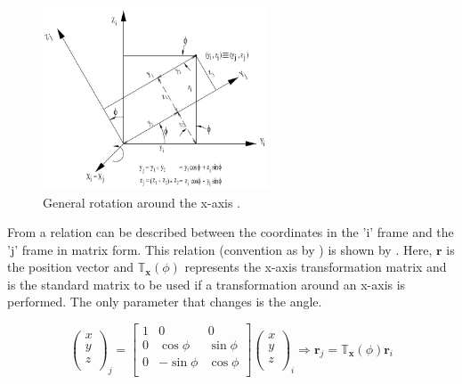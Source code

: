 \begin{figure}[!ht]
\centering
\includegraphics[width=0.6\textwidth]{figures/reference_frames/xtrans_mooij2013stat.jpg}
\caption{General rotation around the x-axis \citep{mooij2013stat}.}
\label{fig:xtrans_mooij2013stat}
\end{figure}

From  a relation can be described between the coordinates in the 'i' frame and the 'j' frame in matrix form. This relation (convention as by \cite{mooij2013stat}) is shown by . Here, $\mathbf{r}$ is the position vector and $\mathbb{T}_{\mathbf{x}}(\phi)$ represents the x-axis transformation matrix and is the standard matrix to be used if a transformation around an x-axis is performed. The only parameter that changes is the angle.


\begin{equation} \label{eq:xaxistransmatr}
\begin{pmatrix}
x\\
y\\
z\\
\end{pmatrix}_{j}=
\begin{bmatrix}
1 & 0 & 0 \\
0 & \cos\phi & \sin\phi \\
0 & -\sin\phi & \cos\phi \\
\end{bmatrix}
\begin{pmatrix}
x\\
y\\
z\\
\end{pmatrix}_{i}\Rightarrow
\mathbf{r}_{j}=\mathbb{T}_{\mathbf{x}}(\phi)\mathbf{r}_{i}
\end{equation}


